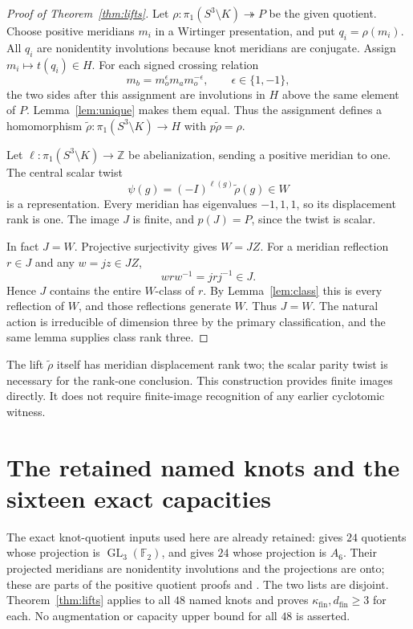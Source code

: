 \documentclass[11pt]{article}
\newcommand{\F}{\mathbb F}
\newcommand{\GL}{\operatorname{GL}}
\newcommand{\kfin}{\kappa_{\mathrm{fin}}}
\newcommand{\dfin}{d_{\mathrm{fin}}}
\begin{document}
\begin{proof}[Proof of Theorem~\ref{thm:lifts}]
Let $\rho:\pi_1(S^3\setminus K)\twoheadrightarrow P$ be the given
quotient. Choose positive meridians $m_i$ in a Wirtinger
presentation, and put $q_i=\rho(m_i)$. All $q_i$ are nonidentity
involutions because knot meridians are conjugate.
Assign $m_i\mapsto t(q_i)\in H$.
For each signed crossing relation
\[
                    m_b=m_o^{\epsilon}m_a m_o^{-\epsilon},
                       \qquad \epsilon\in\{1,-1\},
\]
the two sides after this assignment are involutions in $H$ above
the same element of $P$. Lemma~\ref{lem:unique} makes them equal.
Thus the assignment defines a homomorphism
$\widetilde\rho:\pi_1(S^3\setminus K)\to H$ with
$p\widetilde\rho=\rho$.

Let $\ell:\pi_1(S^3\setminus K)\to\mathbb Z$ be abelianization,
sending a positive meridian to one. The central scalar twist
\[
              \psi(g)=(-I)^{\ell(g)}\widetilde\rho(g)\in W
\]
is a representation. Every meridian has eigenvalues $-1,1,1$,
so its displacement rank is one. The image $J$ is finite, and
$p(J)=P$, since the twist is scalar.

In fact $J=W$. Projective surjectivity gives $W=JZ$.
For a meridian reflection $r\in J$ and any $w=jz\in JZ$,
\[
                       wrw^{-1}=jrj^{-1}\in J.
\]
Hence $J$ contains the entire $W$-class of $r$. By
Lemma~\ref{lem:class} this is every reflection of $W$, and those
reflections generate $W$. Thus $J=W$.
The natural action is irreducible of dimension three by the
primary classification, and the same lemma supplies class rank three.
\end{proof}

The lift $\widetilde\rho$ itself has meridian displacement rank two;
the scalar parity twist is necessary for the rank-one conclusion.
This construction provides finite images directly. It does not
require finite-image recognition of any earlier cyclotomic witness.

\section{The retained named knots and the sixteen exact capacities}

The exact knot-quotient inputs used here are already retained:
 gives $24$ quotients whose
projection is $\GL_3(\F_2)$, and  gives
$24$ whose projection is $A_6$. Their projected meridians are
nonidentity involutions and the projections are onto; these are
parts of the positive quotient proofs
\cite[Theorem~\texttt{thm:knots}]{ternary} and
\cite[Theorems~\texttt{thm:sharp}, \texttt{thm:groups}]{a6}.
The two lists are disjoint. Theorem~\ref{thm:lifts} applies to all
$48$ named knots and proves $\kfin,\dfin\ge3$ for each.
No augmentation or capacity upper bound for all $48$ is asserted.
\end{document}
